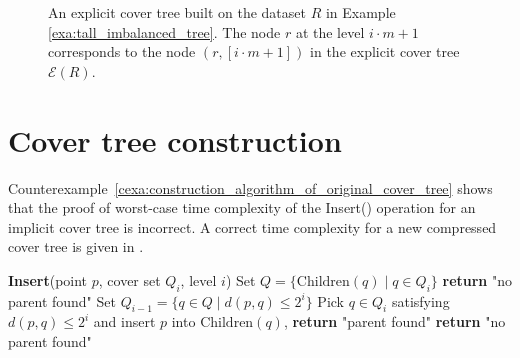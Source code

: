 \documentclass{vgtc}                          %
\numberwithin{algocf}{section}
\theoremstyle{definition}
\theoremstyle{definition}
\theoremstyle{definition}
\theoremstyle{plain}
\newcommand{\Child}{\mathrm{Children}}
\newcommand{\T}{\mathcal{E}}
\begin{document}






\begin{figure}
	\centering
	
	
	
	\caption{An explicit cover tree built on the dataset $R$ in Example \ref{exa:tall_imbalanced_tree}.
	The node $r$ at the level $i \cdot m+1$ corresponds to the node $(r,[i \cdot m + 1])$ in the explicit cover tree $\T(R)$.
	}
	\label{fig:bad_cover_tree}
\end{figure}

\section{Cover tree construction}
\label{sec:tree_construction}

Counterexample~\ref{cexa:construction_algorithm_of_original_cover_tree} shows that the proof of worst-case time complexity of the Insert() operation for an implicit cover tree \cite[Theorem~6]{beygelzimer2006cover} is incorrect. A correct time complexity for a new compressed cover tree is given in \cite[Corollary~3.53]{2205.10194}. 

\begin{algorithm}
	\caption{Copy-pasted Insert() algorithm for inserting a point $p$ into an implicit cover tree $T$ \cite[Algorithm~2]{beygelzimer2006cover}. This algorithm is launched with $i = l_{\max}$ and $Q_{i} = \{r\}$, where $r$ is the root node of $T$. }
	\label{alg:cover_tree_construction_original}
	\begin{algorithmic}[1]
		\STATE \textbf{Insert}(point $p$, cover set $Q_i$, level $i$)
		\STATE Set $Q = \{\Child(q) \mid q \in Q_i\}$
		\STATE \textbf{return} "no parent found"
		\ELSE
		\STATE Set $Q_{i-1} = \{q \in Q \mid d(p,q) \leq 2^{i}\}$
		\STATE Pick $q \in Q_i$ satisfying $d(p,q) \leq 2^{i}$ and insert $p$ into $\Child(q)$, \textbf{return} "parent found"
		\ELSE
		\STATE \textbf{return} "no parent found"
		\ENDIF
		
		\ENDIF 
		
	\end{algorithmic}
\end{algorithm}
\end{document}
